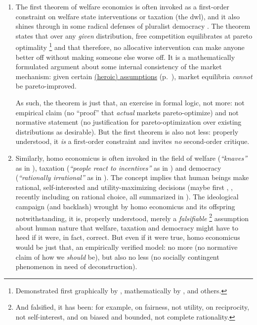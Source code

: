 \begin{enumerate}
	\item
	The first theorem of welfare economics is often invoked as a first-order constraint on welfare state interventions or taxation (the \gls{dwl}), and it also shines through in some radical defenses of pluralist democracy \citep[for example,][]{Caplan2007}.
	The theorem states that over any \emph{given} distribution, free competition equilibrates at pareto optimality
	\footnote{
		Demonstrated first graphically by \cite{Lerner1944}, mathematically by \cite{Lange1934}, \cite{Debreu1954} and others.
	}
	and that therefore, no allocative intervention can make anyone better off without making someone else worse off.
	It is a mathematically formulated argument about some internal consistency of the market mechanism:
	given certain \hyperref[sec:perfect-competition]{(heroic) assumptions} (p.~\pageref{sec:perfect-competition}), market equilibria \emph{cannot} be pareto-improved.

	As such, the theorem is just that, an exercise in formal logic, not more:
	not empirical claim (no ``proof'' that \emph{actual} markets pareto-optimize) and not normative statement (no justification for pareto-optimization over existing distributions as desirable).
	But the first theorem is also not less:
	properly understood, it \emph{is} a first-order constraint and invites \emph{no} second-order critique.

	\item
	Similarly, homo economicus is often invoked in the field of welfare (\emph{``knaves''} as in \citealt{LeGrand2003}), taxation (\emph{``people react to incentives''} as in \citealt[24]{Mankiw-2004-aa}) and democracy (\emph{``rationally irrational''} as in \citealt{Caplan2007}).
	The concept implies that human beings make rational, self-interested and utility-maximizing decisions (maybe first \citeauthor{Mill1848}, \citeauthor{Smith-1776-lq}, recently including \citealt{Robbins1976} on rational choice, all summarized in \citealt{Persky1995}).
	The ideological campaign (and backlash) wrought by homo economicus and its offspring notwithstanding, it is, properly understood, merely a \emph{falsifiable}
	\footnote{
		And falsified, it has been:
		for example, \cite{Alvard2004} on fairness, not utility, \cite{Zak2004a} on reciprocity, not self-interest, \cite{KahnemanEtAl1982} and \cite{Simon-2001-aa} on biased and bounded, not complete rationality.
	}
	assumption about human nature that welfare, taxation and democracy might have to heed if it were, in fact, correct.
	But even if it were true, homo economicus would be just that, an empirically verified model:
	no more (no normative claim of how we \emph{should} be), but also no less (no socially contingent phenomenon in need of deconstruction).
\end{enumerate}

